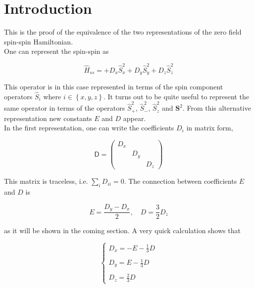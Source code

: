 \documentclass[A4paper, 12pt]{article}
\begin{document}
\section{Introduction} %
\label{sec:introduction}



This is the proof of the equivalence of the two representations of the zero
field spin-spin Hamiltonian. \\

One can represent the spin-spin as

\begin{equation}
  \hat{H} _{ss} =
  + D _{x} \hat S ^{2} _{x}
  + D _{y} \hat S ^{2} _{y}
  + D _{z} \hat S ^{2} _{z}
\end{equation}

This operator is in this case represented in terms of the spin component
operators $ \hat{S}_{i}  $ where $ i \in \left \{ x,y,z \right \} $.  It turns
out to be quite useful to represent the same operator in terms of the operators
$ \hat{S}_{+}^{2}   $, $ \hat{S}_{-}^{2}   $, $ \hat{S}_{z}^{2}   $ and $
\mathbf{S}^{2}  $.  From this alternative representation new constants $ E $
and $ D $ appear.\\

In the first representation, one can write the coefficients $ D_{i}  $  in matrix form,

\begin{equation}
  \mathsf{D} =
  \left(
    \begin{matrix}
      D _{x} &         &         \\
              & D _{y} &         \\
              &         & D _{z}
    \end{matrix}
  \right)
\end{equation}

This matrix is traceless, i.e. $ \sum_{i} D _{ii} = 0
$. The connection between coefficients $ E  $ and $ D $ is

\begin{equation}
  E = \frac{D _{y} - D _{x}}{2}, \quad D = \frac{3}{2}D _{z}
\end{equation}

as it will be shown in the coming section.  A very quick calculation shows that

\begin{equation}
  \left\{
  \begin{matrix}
    D _{x} = -E - \frac{1}{3} D \\
                                 \\
    D _{y} =  E - \frac{1}{3} D \\
                                 \\
    D _{z} = \frac{2}{3} D
  \end{matrix}
  \right .
\end{equation}
\end{document}
